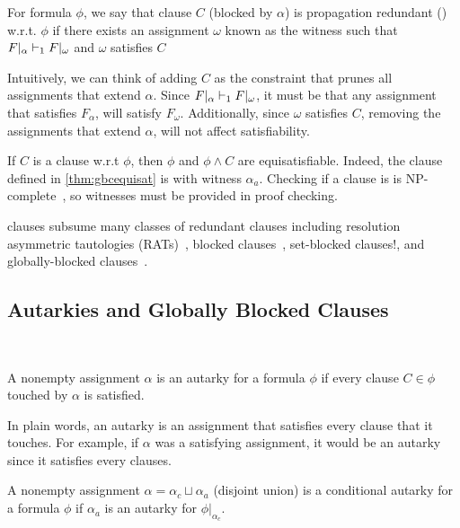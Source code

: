 \begin{definition}
    For formula $\phi$, we say that clause $C$ (blocked by $\alpha$) is propagation redundant (\pr) w.r.t. $\phi$ if there exists an assignment $\omega$ known as the witness such that $F|_\alpha \vdash_1 F|_\omega$ and $\omega$ satisfies $C$
\end{definition}

Intuitively, we can think of adding $C$ as the constraint that prunes all assignments that extend $\alpha$. Since $F|_\alpha \vdash_1 F|_\omega$, it must be that any assignment that satisfies $F_\alpha$, will satisfy $F_\omega$. Additionally, since $\omega$ satisfies $C$, removing the assignments that extend $\alpha$, will not affect satisfiability.

If $C$ is a \pr clause w.r.t $\phi$, then $\phi$ and $\phi \land C$ are equisatisfiable. Indeed, the clause defined in \autoref{thm:gbcequisat} is \pr with witness $\alpha_a$. Checking if a clause is \pr is NP-complete~\cite{prclause}, so witnesses must be provided in proof checking.

\pr clauses subsume many classes of redundant clauses including resolution asymmetric tautologies (RATs)~\cite{rat}, blocked clauses~\cite{blockedclause}, set-blocked clauses!\cite{setblocked}, and globally-blocked clauses~\cite{conditionalautarkies}.

\subsection{Autarkies and Globally Blocked Clauses}~\label{subsec:autarkies}


\begin{definition}[Autarky]
    A nonempty assignment $\alpha$ is an autarky for a formula $\phi$ if every clause $C \in \phi$ touched by $\alpha$ is satisfied.
\end{definition}


In plain words, an autarky is an assignment that satisfies every clause that it touches. For example, if $\alpha$ was a satisfying assignment, it would be an autarky since it satisfies every clauses.

\begin{definition}
    A nonempty assignment $\alpha = \alpha_c \sqcup \alpha_a$ (disjoint union) is a conditional autarky for a formula $\phi$ if $\alpha_a$ is an autarky for $\phi|_{\alpha_c}$.
\end{definition}

